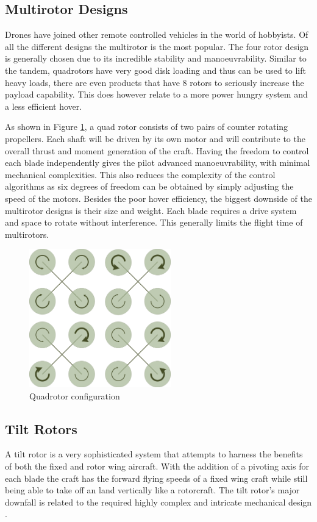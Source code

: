 \subsection{Multirotor Designs}
Drones have joined other remote controlled vehicles in the world of hobbyists. Of all the different designs the multirotor is the most popular. The four rotor design is generally chosen due to its incredible stability and manoeuvrability. Similar to the tandem, quadrotors have very good disk loading and thus can be used to lift heavy loads, there are even products that have 8 rotors to seriously increase the payload capability. This does however relate to a more power hungry system and a less efficient hover.

As shown in Figure \ref{IM_CounterBlades}, a quad rotor consists of two pairs of counter rotating propellers. Each shaft will be driven by its own motor and will contribute to the overall thrust and moment generation of the craft. Having the freedom to control each blade independently gives the pilot advanced manoeuvrability, with minimal mechanical complexities. This also reduces the complexity of the control algorithms as six degrees of freedom can be obtained by simply adjusting the speed of the motors. Besides the poor hover efficiency, the biggest downside of the multirotor designs is their size and weight. Each blade requires a drive system and space to rotate without interference. This generally limits the flight time of multirotors.

\begin{figure}[H]
	\centering
	\includegraphics[height =6cm]{Images/Literature/quadrotor}
	\caption{Quadrotor configuration \cite{ThrustCritical}}
	\label{IM_CounterBlades}
\end{figure}

\subsection{Tilt Rotors}
A tilt rotor is a very sophisticated system that attempts to harness the benefits of both the fixed and rotor wing aircraft. With the addition of a pivoting axis for each blade the craft has the forward flying speeds of a fixed wing craft while still being able to take off an land vertically like a rotorcraft. The tilt rotor's major downfall is related to the required highly complex and intricate mechanical design \cite{RotorConfig}.

